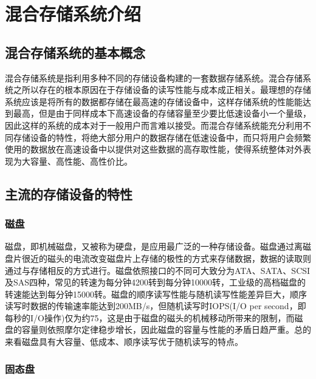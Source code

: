 
\chapter{混合存储系统介绍}
\label{chap:hss}

\section{混合存储系统的基本概念}

混合存储系统是指利用多种不同的存储设备构建的一套数据存储系统。混合存储系统之所以存在的根本原因在于存储设备的读写性能与成本成正相关。最理想的存储系统应该是将所有的数据都存储在最高速的存储设备中，这样存储系统的性能能达到最高，但是由于同样成本下高速设备的存储容量至少要比低速设备小一个量级，因此这样的系统的成本对于一般用户而言难以接受。而混合存储系统能充分利用不同存储设备的特性，将绝大部分用户的数据存储在低速设备中，而只将用户会频繁使用的数据放在高速设备中以提供对这些数据的高存取性能，使得系统整体对外表现为大容量、高性能、高性价比。

\section{主流的存储设备的特性}

\subsection{磁盘}

磁盘，即机械磁盘，又被称为硬盘，是应用最广泛的一种存储设备。磁盘通过离磁盘片很近的磁头的电流改变磁盘片上存储的极性的方式来存储数据，数据的读取则通过与存储相反的方式进行。磁盘依照接口的不同可大致分为ATA、SATA、SCSI及SAS四种，常见的转速为每分钟4200转到每分钟10000转，工业级的高档磁盘的转速能达到每分钟15000转。磁盘的顺序读写性能与随机读写性能差异巨大，顺序读写时数据的传输速率能达到200MB/s，但随机读写时IOPS(I/O per second，即每秒的I/O操作)仅为约75，这是由于磁盘的磁头的机械移动所带来的限制，而磁盘的容量则依照摩尔定律稳步增长，因此磁盘的容量与性能的矛盾日趋严重。总的来看磁盘具有大容量、低成本、顺序读写优于随机读写的特点。

\subsection{固态盘}

